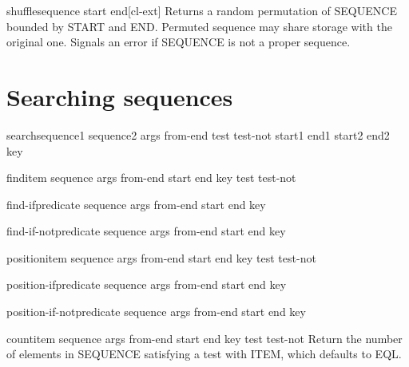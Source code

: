 \documentclass[10pt,english]{book}
\begin{document}
\begin{function}{shuffle}{sequence \key start end}[cl-ext]
  Returns a random permutation of SEQUENCE bounded by START and END.
  Permuted sequence may share storage with the original one. Signals
  an error if SEQUENCE is not a proper sequence.
\end{function}

\section{Searching sequences}
\label{sec:searching-sequences}

\begin{function}{search}{sequence1 sequence2 \rest args \key from-end test test-not start1 end1 start2
    end2 key}
  
\end{function}

\begin{function}{find}{item sequence \rest args \key from-end start end key test test-not}
  
\end{function}

\begin{function}{find-if}{predicate sequence \rest args \key from-end start end key}
  
\end{function}

\begin{function}{find-if-not}{predicate sequence \rest args \key from-end start end key}
  
\end{function}

\begin{function}{position}{item sequence \rest args \key from-end start end key test test-not}
  
\end{function}

\begin{function}{position-if}{predicate sequence \rest args \key from-end start end key}
  
\end{function}

\begin{function}{position-if-not}{predicate sequence \rest args \key from-end start end key}
  
\end{function}

\begin{function}{count}{item sequence \rest args \key from-end start end key test test-not}
  Return the number of elements in SEQUENCE satisfying a test with ITEM,
  which defaults to EQL.
\end{function}
\end{document}
